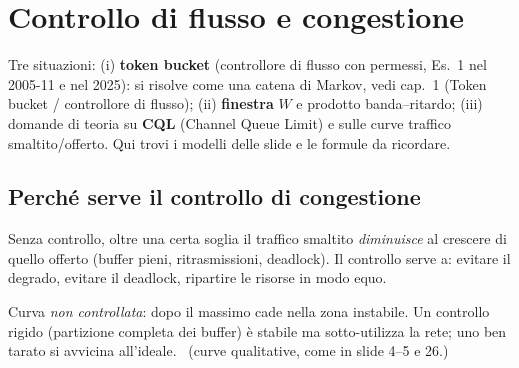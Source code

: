\chapter{Controllo di flusso e congestione}\label{cap7-flusso}\label{cap:flusso}

\begin{nota}
Tre situazioni: (i) \textbf{token bucket} (controllore di flusso con permessi, Es.~1 nel 2005-11 e nel 2025): si risolve come una catena di Markov, vedi cap.~1 (\guillemotleft{}Token bucket / controllore di flusso\guillemotright{}); (ii) \textbf{finestra} $W$ e prodotto banda--ritardo; (iii) domande di teoria su \textbf{CQL} (Channel Queue Limit) e sulle curve traffico smaltito/offerto. Qui trovi i modelli delle slide e le formule da ricordare.
\end{nota}

\section{Perché serve il controllo di congestione}\label{cap7-perche}
Senza controllo, oltre una certa soglia il traffico smaltito \emph{diminuisce} al crescere di quello offerto (buffer pieni, ritrasmissioni, deadlock). Il controllo serve a: evitare il degrado, evitare il deadlock, ripartire le risorse in modo equo.

\begin{center}
\end{center}
Curva \emph{non controllata}: dopo il massimo cade nella zona instabile. Un controllo rigido (partizione completa dei buffer) è stabile ma sotto-utilizza la rete; uno ben tarato si avvicina all'ideale. \mio\ (curve qualitative, come in slide 4--5 e 26.)

